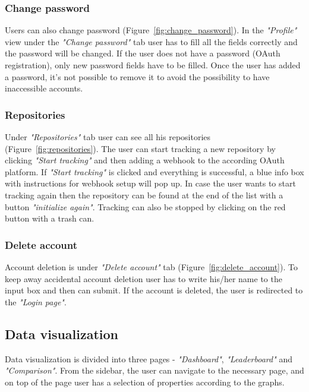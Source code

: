 \subsubsection{Change password}\label{subsubsec:change-password}
Users can also change password (Figure~\ref{fig:change_password}).
In the \textit{"Profile"} view under the \textit{"Change password"} tab user has to fill all the fields correctly and the password will be changed.
If the user does not have a password (OAuth registration), only new password fields have to be filled.
Once the user has added a password, it's not possible to remove it to avoid the possibility to have inaccessible accounts.

\subsubsection{Repositories}\label{subsubsec:repositories}
Under \textit{"Repositories"} tab user can see all his repositories (Figure~\ref{fig:repositories}).
The user can start tracking a new repository by clicking \textit{"Start tracking"} and then adding a webhook to the according OAuth platform.
If \textit{"Start tracking"} is clicked and everything is successful, a blue info box with instructions for webhook setup will pop up.
In case the user wants to start tracking again then the repository can be found at the end of the list with a button \textit{"initialize again"}.
Tracking can also be stopped by clicking on the red button with a trash can.

\subsubsection{Delete account}\label{subsubsec:delete-account}
Account deletion is under \textit{"Delete account"} tab (Figure~\ref{fig:delete_account}).
To keep away accidental account deletion user has to write his/her name to the input box and then can submit.
If the account is deleted, the user is redirected to the \textit{"Login page"}.

\subsection{Data visualization}\label{subsec:data-visualization}
Data visualization is divided into three pages - \textit{"Dashboard"}, \textit{"Leaderboard"} and \textit{"Comparison"}.
From the sidebar, the user can navigate to the necessary page, and on top of the page user has a selection of properties according to the graphs.

